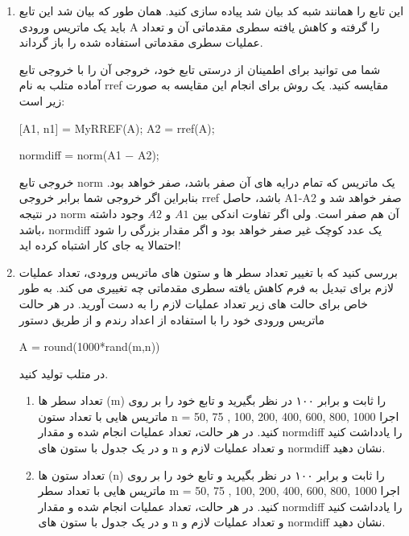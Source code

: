 \documentclass{article}
\begin{document}
\begin{enumerate}
	\item 
	این تابع را همانند شبه کد بیان شد پیاده سازی کنید.  همان طور که بیان شد این تابع باید یک ماتریس ورودی A را گرفته و کاهش یافته سطری مقدماتی آن و تعداد عملیات سطری مقدماتی استفاده شده را باز گرداند.
	
	شما می توانید برای اطمینان از درستی تابع خود، خروجی آن را با خروجی تابع آماده متلب به نام rref مقایسه کنید. یک روش برای انجام این مقایسه به صورت زیر است:
\begin{latin}

	[A1, n1] = MyRREF(A);  A2 = rref(A); 

normdiff = norm(A1 − A2);  

\end{latin}
	
	
	خروجی تابع norm یک ماتریس که تمام درایه های آن صفر باشد، صفر خواهد بود. بنابراین اگر خروجی شما برابر خروجی rref باشد، حاصل A1-A2 صفر خواهد شد و در نتیجه norm آن هم صفر است. ولی اگر تفاوت اندکی  بین $A1$  و $A2$ وجود داشته باشد، normdiff یک عدد کوچک غیر صفر خواهد بود و اگر مقدار بزرگی را شود احتمالا یه جای کار اشتباه کرده اید!
	
	\item
	 بررسی کنید که با تغییر تعداد سطر ها و ستون های ماتریس ورودی،‌ تعداد عملیات لازم برای تبدیل به فرم کاهش یافته سطری مقدماتی چه تغییری می کند. به طور خاص برای حالت های زیر تعداد عملیات لازم را به دست آورید. در هر حالت ماتریس ورودی خود را با استفاده از اعداد رندم و از طریق دستور
\begin{latin}
	A = round(1000*rand(m,n))
\end{latin}
	  در متلب تولید کنید.
	 \begin{enumerate}
	 	\item 
	 تعداد سطر ها (m) را ثابت و برابر ۱۰۰ در نظر بگیرید و تابع خود را بر روی ماتریس هایی با تعداد ستون n = 50, 75 , 100, 200, 400, 600, 800,  1000 اجرا کنید. در هر حالت، تعداد عملیات انجام شده و مقدار normdiff را یادداشت کنید و در یک جدول با ستون های n و تعداد عملیات لازم و normdiff نشان دهید.
	 	\item 
	 	تعداد ستون ها (n) را ثابت و برابر ۱۰۰ در نظر بگیرید و تابع خود را بر روی ماتریس هایی با تعداد سطر m = 50, 75 , 100, 200, 400, 600, 800,  1000 اجرا کنید. در هر حالت، تعداد عملیات انجام شده و مقدار normdiff را یادداشت کنید و در یک جدول با ستون های n و تعداد عملیات لازم و normdiff نشان دهید.
	 \end{enumerate}
	

\end{enumerate}
\end{document}
